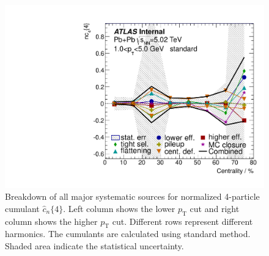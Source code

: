\begin{figure}[H]
\includegraphics[width=.425\linewidth]{figs/sec_sys/summary/sys_nc4_1sub_Har4_Pt1.pdf}
\caption{Breakdown of all major systematic sources for normalized 4-particle cumulant $\hat{c}_n\{4\}$. Left column shows the lower $p_\text{T}$ cut and right column shows the higher $p_\text{T}$ cut. Different rows represent different harmonics. The cumulants are calculated using standard method. Shaded area indicate the statistical uncertainty.}
\label{fig:sys_sum_nc4}
\end{figure}

